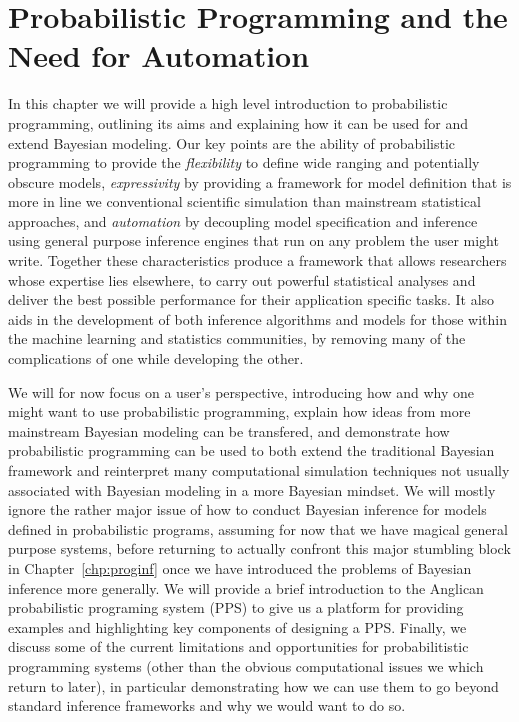 
\chapter{Probabilistic Programming and the Need for Automation}
\label{chp:probprog}


In this chapter we will provide a high level introduction to probabilistic programming,
outlining its aims and explaining how it can be used for and extend Bayesian modeling.  Our
key points are the ability of probabilistic programming to provide the \emph{flexibility} to define
wide ranging and potentially obscure models, \emph{expressivity} by providing a framework for 
model definition that is more in line we conventional scientific simulation than mainstream 
statistical approaches, and \emph{automation} by decoupling model specification and inference 
using general purpose inference engines that run on any problem the user might write.  
Together these characteristics produce a framework that allows researchers whose expertise 
lies elsewhere, to carry out powerful statistical analyses and deliver the best possible 
performance for their application specific tasks.  It also aids in the development of both inference
algorithms and models for those within the machine learning and statistics communities,
by removing many of the complications of one while developing the other.

We will for now focus on a user's perspective, introducing how and why one might want to use
probabilistic programming, explain how ideas from more mainstream Bayesian
modeling can be transfered, and demonstrate how probabilistic programming can be
used to both extend the traditional Bayesian framework and reinterpret many computational simulation
techniques not usually associated with Bayesian modeling in a more Bayesian mindset.
We will mostly ignore the rather major issue of how to conduct Bayesian inference for
models defined in probabilistic programs, assuming for now that we have magical
general purpose systems, before returning to actually confront this major stumbling
block in Chapter~\ref{chp:proginf} once we have introduced the problems of Bayesian
inference more generally.  We will provide a brief introduction to the Anglican probabilistic
programing system (PPS) to give us a platform for providing examples and highlighting
key components of designing a PPS.  Finally, we discuss some of the current limitations
and opportunities for probabilitistic programming systems (other than the obvious computational
issues we which return to later), in particular demonstrating how we can use them to go beyond
standard inference frameworks and why we would want to do so.


